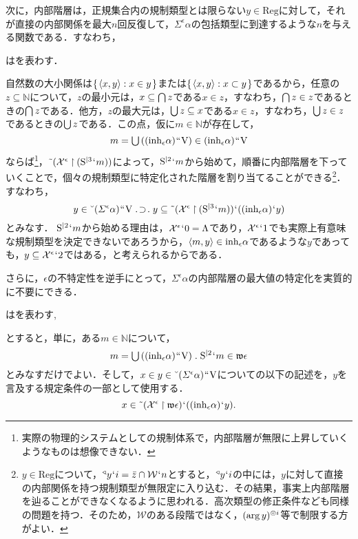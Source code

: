 次に，内部階層は，正規集合内の規制類型とは限らない$y\in\mathrm{Reg}$に対して，それが直接の内部関係を最大$n$回反復して，$\varSigma^{\epsilon}\alpha$の包括類型に到達するような$n$を与える関数である．すなわち，
\begin{df}
\label{df:内部階層}
はを表わす．
\end{df}

\noindent 自然数の大小関係は$\{\mspace{2mu}\langle x,y \rangle:x\in y\mspace{2mu}\}$または$\{\mspace{2mu}\langle x,y \rangle:x\subset y\mspace{2mu}\}$であるから，任意の$ z\subseteq\mathbb{N} $について，$z$の最小元は，$x\subseteq{\textstyle\bigcap}\mspace{3mu}z$である$x\in z$，すなわち，${\textstyle\bigcap}\mspace{3mu}z\in z$であるときの$ {\textstyle\bigcap}\mspace{3mu}z $である．他方，$z$の最大元は，$ {\textstyle\bigcup}\mspace{3mu}z\subseteq x $である$x\in z$，すなわち，${\textstyle\bigcup}\mspace{3mu}z\in z$であるときの$ {\textstyle\bigcup}\mspace{3mu}z $である．この点，仮に$ m\in\mathbb{N} $が存在して，
\[
    m = {\textstyle\bigcup}\mspace{3mu}((\mathrm{inh}_\epsilon\alpha){\mspace{1mu}{``}\mspace{1mu}}\mathrm{V})\in (\mathrm{inh}_\epsilon\alpha){\mspace{1mu}{``}\mspace{1mu}}\mathrm{V}
\]
ならば\footnote{実際の物理的システムとしての規制体系で，内部階層が無限に上昇していくようなものは想像できない．}，$ \tilde{\:\:}(\mathcal{X}^\epsilon \mathbin{\upharpoonright} (\mathrm{S}^{\mid 3}{\mspace{1mu}{`}\mspace{1mu}} m)) $によって，$\mathrm{S}^{\mid 2}{\mspace{1mu}{`}\mspace{1mu}} m$から始めて，順番に内部階層を下っていくことで，個々の規制類型に特定化された階層を割り当てることができる\footnote{
    $ y\in\mathrm{Reg} $について，$ {^\triangleleft}y{\mspace{1mu}{`}\mspace{1mu}} i = \bar{z}\cap\mathcal{W}{\mspace{1mu}{`}\mspace{1mu}} n $とすると，$ {^\triangleleft}y{\mspace{1mu}{`}\mspace{1mu}} i $の中には，$y$に対して直接の内部関係を持つ規制類型が無限定に入り込む．その結果，事実上内部階層を辿ることができなくなるように思われる．高次類型の修正条件なども同様の問題を持つ．そのため，$\mathcal{W}$のある段階ではなく，$ (\arg y)^{\circledcirc i} $等で制限する方がよい．
}．すなわち，
\[
    y\in\brevel{(\varSigma^{\epsilon}\alpha)}\img\univ\case{1}{1}{1}
   y\subseteq \tildel{(\mathcal{X}^\epsilon \uphr  (\iter{\mathrm{S}}{3}\fap m))}\fap((\mathrm{inh}_\epsilon\alpha)\fap y)
\]
とみなす．
$ \mathrm{S}^{\mid 2}{\mspace{1mu}{`}\mspace{1mu}} m $から始める理由は，$ \mathcal{X}^\epsilon{\mspace{1mu}{`}\mspace{1mu}} 0 = \Lambda $であり，$ \mathcal{X}^\epsilon{\mspace{1mu}{`}\mspace{1mu}} 1 $でも実際上有意味な規制類型を決定できないであろうから，$ \langle m,y \rangle\in\mathrm{inh}_\epsilon\alpha $であるような$y$であっても，$ y\subseteq \mathcal{X}^\epsilon{\mspace{1mu}{`}\mspace{1mu}} 2 $ではある，と考えられるからである．

さらに，$\epsilon$の不特定性を逆手にとって，$ \varSigma^{\epsilon}\alpha $の内部階層の最大値の特定化を実質的に不要にできる．
\begin{df}
\label{df:内部階層の最大値}
はを表わす,
\end{df}
\noindent とすると，単に，ある$ m\in\mathbb{N} $について，
\[
    m = \union{((\mathrm{inh}_\epsilon\alpha)\img\univ)}\con{1}
    \iter{\mathrm{S}}{2}\fap m \in \mathfrak{w}\epsilon
\]
とみなすだけでよい．そして，$ x\in y\in\breve{\:\:}(\varSigma^{\epsilon}\alpha){\mspace{1mu}{``}\mspace{1mu}}\mathrm{V} $についての以下の記述を，$y$を言及する規定条件の一部として使用する．
\[
    x\in\tilde{\:\:}(\mathcal{X}^\epsilon \mathbin{\upharpoonright}\mathfrak{w}\epsilon){\mspace{1mu}{`}\mspace{1mu}}((\mathrm{inh}_\epsilon\alpha){\mspace{1mu}{`}\mspace{1mu}} y).
\]

